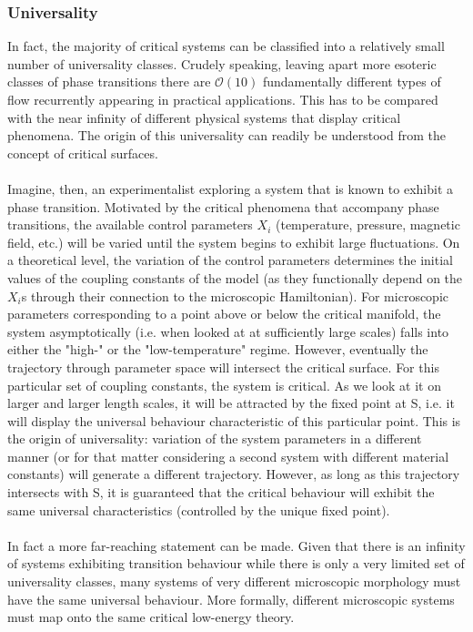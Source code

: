 \subsubsection{Universality}
In fact, the majority of critical systems can be classified into a relatively small number of universality classes. Crudely speaking, leaving apart more esoteric classes of phase transitions there are $\mathcal{O}(10)$ fundamentally different types of flow recurrently appearing in practical applications. This has to be compared with the near infinity of different physical systems that display critical phenomena. The origin of this universality can readily be understood from the concept of critical surfaces.
\\ \\
Imagine, then, an experimentalist exploring a system that is known to exhibit a phase transition. Motivated by the critical phenomena that accompany phase transitions, the available control parameters $X_i$ (temperature, pressure, magnetic field, etc.) will be varied until the system begins to exhibit large fluctuations. On a theoretical level, the variation of the control parameters determines the initial values of the coupling constants of the model (as they functionally depend on the $X_i$s through their connection to the microscopic Hamiltonian). For microscopic parameters corresponding to a point above or below the critical manifold, the system asymptotically (i.e. when looked at at sufficiently large scales) falls into either the "high-" or the "low-temperature" regime. 
However, eventually the trajectory through parameter space will intersect the critical surface. For this particular set of coupling constants, the system is critical. As we look at it on larger and larger length scales, it will be attracted by the fixed point at S, i.e. it will display the universal behaviour characteristic of this particular point. 
This is the origin of universality: variation of the system parameters in a different manner (or for that matter considering a second system with different material constants) will generate a different trajectory. 
However, as long as this trajectory intersects with S, it is guaranteed that the critical behaviour will exhibit the same universal characteristics (controlled by the unique fixed point).
\\ \\
In fact a more far-reaching statement can be made. Given that there is an infinity of systems exhibiting transition behaviour while there is only a very limited set of universality classes, many systems of very different microscopic morphology must have the same universal behaviour. More formally, different microscopic systems must map onto the same critical low-energy theory.

